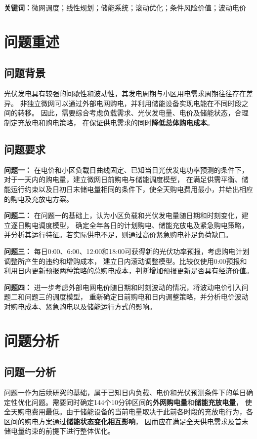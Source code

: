 \documentclass[UTF8,a4paper,12pt]{ctexart}
\begin{document}
\noindent\textbf{关键词：}微网调度；线性规划；储能系统；滚动优化；条件风险价值；波动电价

\section{问题重述}

\subsection{问题背景}

光伏发电具有较强的间歇性和波动性，其发电周期与小区用电需求周期往往存在差异。
非独立微网可以通过外部电网购电，并利用储能设备实现电能在不同时段之间的转移。
因此，需要综合考虑负载需求、光伏发电量、电价及储能状态，合理制定充放电和购电策略，
在保证供电需求的同时\textbf{降低总体购电成本}。

\subsection{问题要求}

\textbf{问题一：}
在电价和小区负载日曲线固定、已知当日光伏发电功率预测的条件下，对于一天内的购电量，建立微网日前购电与储能调度模型，
在满足供需平衡、储能运行约束以及日初日末储电量相同的条件下，使全天购电费用最小，并给出相应的购电及充放电方案。

\textbf{问题二：}
在问题一的基础上，认为小区负载和光伏发电量随日期和时刻变化，建立逐日购电调度模型，
确定全年各日的计划购电、储能充放电及紧急购电策略，并分析其运行特征。若实际供电不足，则通过高价紧急购电补足负荷缺口。

\textbf{问题三：}
每日0:00、6:00、12:00和18:00可获得新的光伏功率预报，考虑购电计划调整所产生的违约和增购成本，
建立日内滚动调整模型。比较仅使用0:00预报和利用日内更新预报两种策略的总购电成本，判断增加预报更新是否具有经济价值。

\textbf{问题四：}
进一步考虑外部电网电价随日期和时刻波动的情况，将波动电价引入问题二和问题三的调度模型，
重新确定日前购电和日内调整策略，并分析电价波动对购电成本、紧急购电以及储能运行方式的影响。

\section{问题分析}

\subsection{问题一分析}
问题一作为后续研究的基础，属于已知日内负载、电价和光伏预测条件下的单日确定性优化问题。需要同时确定144个10分钟区间的\textbf{外网购电量}和\textbf{储能充放电量}，
使全天购电费用最低。由于储能设备的当前电量取决于此前各时段的充放电行为，各区间的购电方案通过\textbf{储能状态变化相互影响}，
因而应在满足全天供电需求及首末储电量约束的前提下进行整体优化。
\end{document}
